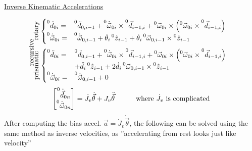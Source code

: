 \documentclass[twocolumn, 12pt]{article}    %
\begin{document}
\noindent\underline{Inverse Kinematic Accelerations}\\
\vspace{5pt}

\[\hspace{-10pt} \text{\rotatebox{90}{\hspace{-50pt}
recursive}} \text{\rotatebox{90}{\hspace{-10pt}rotary}}
\begin{cases}
    \prescript{0}{}{\ddot{d}}_{0i}  =& \prescript{0}{}{\ddot{d}}_{0,i-1} + \prescript{0}{}{\dot{\vec{\omega}}}_{0i} \times \prescript{0}{}{\Vec{d}}_{i-1,i} + \prescript{0}{}{\vec{\omega}}_{0i} \times \left( \prescript{0}{}{\vec{\omega}}_{0i} \times \prescript{0}{}{\vec{d}}_{i-1,i} \right)\\
    \prescript{0}{}{\dot{\vec{\omega}}}_{0i} =& \prescript{0}{}{\dot{\vec{\omega}}}_{0,i-1} + \ddot{\theta}_i \prescript{0}{}{\hat{z}}_{i-1} + \dot{\theta}_i \prescript{0}{}{\vec{\omega}}_{0,i-1} \times \prescript{0}{}{\hat{z}}_{i-1}
\end{cases}
\]
\[\hspace{-3pt}\text{\rotatebox{90}{\hspace{-17.5pt}prismatic}}
\begin{cases}
    \prescript{0}{}{\ddot{d}}_{0i}  =& \prescript{0}{}{\ddot{d}}_{0,i-1} + \prescript{0}{}{\dot{\vec{\omega}}}_{0i} \times \prescript{0}{}{\Vec{d}}_{i-1,i} + \prescript{0}{}{\vec{\omega}}_{0i} \times \left( \prescript{0}{}{\vec{\omega}}_{0i} \times \prescript{0}{}{\vec{d}}_{i-1,i} \right) \\
    &+ \ddot{d}_i \prescript{0}{}{\hat{z}}_{i-1} + 2\dot{d}_i \prescript{0}{}{\vec{\omega}}_{0,i-1} \times \prescript{0}{}{\hat{z}}_{i-1}\\
    \prescript{0}{}{\dot{\vec{\omega}}}_{0i} =& \prescript{0}{}{\dot{\vec{\omega}}}_{0,i-1} + 0
\end{cases}
\]
\begin{equation*}
    \begin{bmatrix}
        \prescript{0}{}{\ddot{\vec{d}}}_{0n} \\ \prescript{0}{}{\dot{\vec{\omega}}}_{0n}
    \end{bmatrix} = \dot{J}_v \dot{\vec{\theta}} + J_v \ddot{\vec{\theta}} \hspace{30pt} \text{where } \dot{J}_v \text{ is complicated} 
\end{equation*}
\noindent After computing the bias accel. \(\vec{a} = \dot{J}_v \dot{\vec{\theta}}\),  the following can be solved using the same method as inverse velocities, as ''accelerating from rest looks just like velocity''
\end{document}
